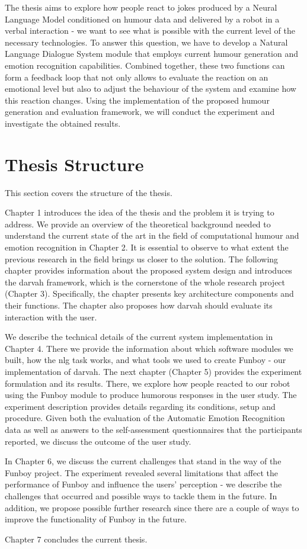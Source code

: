 The thesis aims to explore how people react to jokes produced by a Neural Language Model conditioned on humour data and delivered by a robot in a verbal interaction - we want to see what is possible with the current level of the necessary technologies. To answer this question, we have to develop a Natural Language Dialogue System module that employs current humour generation and emotion recognition capabilities. Combined together, these two functions can form a feedback loop that not only allows to evaluate the reaction on an emotional level but also to adjust the behaviour of the system and examine how this reaction changes. Using the implementation of the proposed humour generation and evaluation framework, we will conduct the experiment and investigate the obtained results. \par

\section{Thesis Structure}

This section covers the structure of the thesis. 

Chapter 1 introduces the idea of the thesis and the problem it is trying to address. We provide an overview of the theoretical background needed to understand the current state of the art in the field of computational humour and emotion recognition in Chapter 2. It is essential to observe to what extent the previous research in the field brings us closer to the solution. The following chapter provides information about the proposed system design and introduces the \acrfull{darvah} framework, which is the cornerstone of the whole research project (Chapter 3). Specifically, the chapter presents key architecture components and their functions. The chapter also proposes how \acrshort{darvah} should evaluate its interaction with the user.

We describe the technical details of the current system implementation in Chapter 4. There we provide the information about which software modules we built, how the \acrshort{nlg} task works, and what tools we used to create Funboy - our implementation of \acrshort{darvah}. The next chapter (Chapter 5) provides the experiment formulation and its results. There, we explore how people reacted to our robot using the Funboy module to produce humorous responses in the user study. The experiment description provides details regarding its conditions, setup and procedure. Given both the evaluation of the Automatic Emotion Recognition data as well as answers to the self-assessment questionnaires that the participants reported, we discuss the outcome of the user study.

In Chapter 6, we discuss the current challenges that stand in the way of the Funboy project. The experiment revealed several limitations that affect the performance of Funboy and influence the users' perception - we describe the challenges that occurred and possible ways to tackle them in the future. In addition, we propose possible further research since there are a couple of ways to improve the functionality of Funboy in the future.

Chapter 7 concludes the current thesis. 